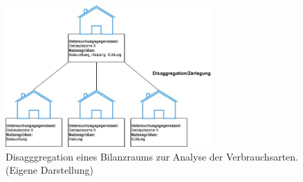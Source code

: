 \begin{figure}[H]
    \centering
    \includegraphics[width=0.7\textwidth]{../../Ressourcen/Abbildungen/Nutzengröße_Bewertungseinheit_Zerlegt.jpg}
    \caption{Disagggregation eines Bilanzraums zur Analyse der Verbrauchsarten. (Eigene Darstellung)}
    \label{fig:Disagggregation_Bilanzraum_Verbrauchsarten}
\end{figure}